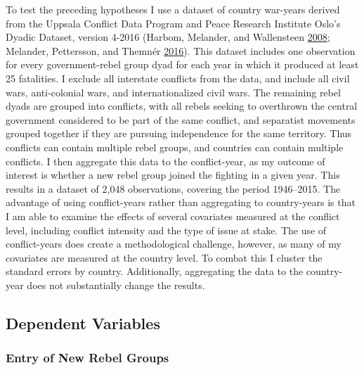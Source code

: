 \documentclass[12pt,]{book}
\theoremstyle{definition}
\theoremstyle{definition}
\theoremstyle{remark}
\begin{document}
To test the preceding hypotheses I use a dataset of country war-years
derived from the Uppsala Conflict Data Program and Peace Research
Institute Oslo's Dyadic Dataset, version 4-2016 (Harbom, Melander, and
Wallensteen \protect\hyperlink{ref-Harbom2008}{2008}; Melander,
Pettersson, and Themnér \protect\hyperlink{ref-Melander2016}{2016}).
This dataset includes one observation for every government-rebel group
dyad for each year in which it produced at least 25 fatalities. I
exclude all interstate conflicts from the data, and include all civil
wars, anti-colonial wars, and internationalized civil wars. The
remaining rebel dyads are grouped into conflicts, with all rebels
seeking to overthrown the central government considered to be part of
the same conflict, and separatist movements grouped together if they are
pursuing independence for the same territory. Thus conflicts can contain
multiple rebel groups, and countries can contain multiple conflicts. I
then aggregate this data to the conflict-year, as my outcome of interest
is whether a new rebel group joined the fighting in a given year. This
results in a dataset of 2,048 observations, covering the period
1946--2015. The advantage of using conflict-years rather than
aggregating to country-years is that I am able to examine the effects of
several covariates measured at the conflict level, including conflict
intensity and the type of issue at stake. The use of conflict-years does
create a methodological challenge, however, as many of my covariates are
measured at the country level. To combat this I cluster the standard
errors by country. Additionally, aggregating the data to the
country-year does not substantially change the results.

\subsection{Dependent Variables}\label{dependent-variables}

\subsubsection*{Entry of New Rebel
Groups}\label{entry-of-new-rebel-groups}
\end{document}
